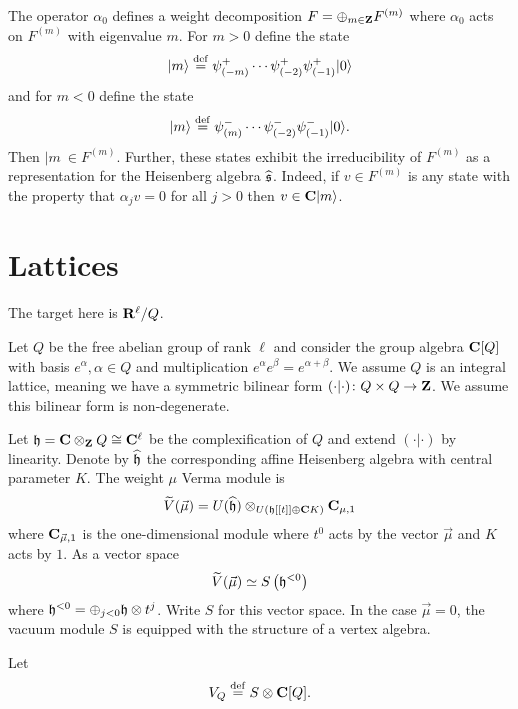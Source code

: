 \documentclass[11pt]{amsart}
\begin{document}
The operator $\alpha_0$ defines a weight decomposition $F = \oplus_{m \in \mathbf{Z}} F^{(m)}$ where $\alpha_0$ acts on $F^{(m)}$ with eigenvalue $m$.
For $m > 0$ define the state
\begin{equation}
|m\rangle \overset{\rm def}{=} \psi^+_{(-m)} \cdots \psi_{(-2)}^+ \psi_{(-1)}^+ |0\rangle 
\end{equation}
and for $m < 0$ define the state
\begin{equation}
|m\rangle \overset{\rm def}{=} \psi^-_{(m)} \cdots \psi_{(-2)}^- \psi_{(-1)}^- |0\rangle  .
\end{equation}
Then $|m\> \in F^{(m)}$.
Further, these states exhibit the irreducibility of $F^{(m)}$ as a representation for the Heisenberg algebra $\widehat{\mathfrak{s}}$.
Indeed, if $v \in F^{(m)}$ is any state with the property that $\alpha_j v = 0$ for all $j > 0$ then $v \in \mathbf{C} |m\rangle$.


\section{Lattices}
The target here is $\mathbf{R}^\ell / Q$.

Let $Q$ be the free abelian group of rank $\ell$ and consider the group algebra $\mathbf{C}[Q]$ with basis $e^{\alpha}, \alpha \in Q$ and multiplication $e^{\alpha} e^{\beta} = e^{\alpha + \beta}$.
We assume $Q$ is an integral lattice, meaning we have a symmetric bilinear form $(\cdot | \cdot) \colon Q \times Q \to \mathbf{Z}$.
We assume this bilinear form is non-degenerate.


Let $\mathfrak{h} = \mathbf{C} \otimes_{\mathbf{Z}} Q \cong \mathbf{C}^\ell$ be the complexification of $Q$ and extend $(\cdot|\cdot)$ by linearity.
Denote by $\widehat{\mathfrak{h}}$ the corresponding affine Heisenberg algebra with central parameter $K$.
The weight $\mu$ Verma module is
\begin{equation}
\widetilde V (\vec{\mu}) = U(\widehat{\mathfrak{h}}) \otimes_{U(\mathfrak{h}[[t]] \oplus \mathbf{C} K)} \mathbf{C}_{\mu, 1}
\end{equation}
where $\mathbf{C}_{\vec{\mu},1}$ is the one-dimensional module where $t^0$ acts by the vector $\vec{\mu}$ and $K$ acts by $1$.
As a vector space
\begin{equation}
\widetilde V (\vec{\mu}) \simeq S \left(\mathfrak{h}^{<0}\right)
\end{equation}
where $\mathfrak{h}^{<0} = \oplus_{j < 0} \mathfrak{h} \otimes t^j$.
Write $S$ for this vector space.
In the case $\vec{\mu} = 0$, the vacuum module $S$ is equipped with the structure of a vertex algebra.

Let 
\begin{equation}
V_Q \overset{\rm def}{=} S \otimes \mathbf{C}[Q] .
\end{equation}
\end{document}
